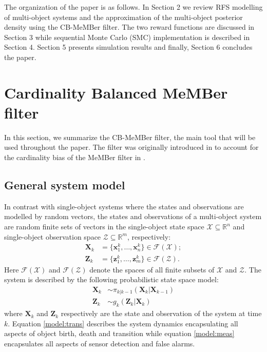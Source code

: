\documentclass[twocolumn]{autart}
\begin{document}
The organization of the paper is as follows. In Section 2 we review RFS
modelling of multi-object systems and the approximation of the multi-object
posterior density using the CB-MeMBer filter. The two reward functions are
discussed in Section 3 while sequential Monte Carlo (SMC) implementation is
described in Section 4. Section 5 presents simulation results and finally,
Section 6 concludes the paper.



\section{Cardinality Balanced MeMBer filter}

In this section, we summarize the CB-MeMBer filter, the main tool that will
be used throughout the paper. The filter was originally introduced in \cite {VVC09} to account for the cardinality bias of the MeMBer filter in \cite {Mah07}.

\subsection{General system model}

In contrast with single-object systems where the states and observations are
modelled by random vectors, the states and observations of a multi-object
system are random finite sets of vectors in the single-object state space $\mathcal{X}\subseteq \mathbb{R}^{n}$ and single-object observation space
$\mathcal{Z}\subseteq \mathbb{R}^{m}$, respectively:
\begin{align}
\mathbf{X}_{k}& =\{\mathbf{x}_{1}^{k},\ldots ,\mathbf{x}_{n}^{k}\}\in
\mathcal{F}(\mathcal{X}); \\
\mathbf{Z}_{k}& =\{\mathbf{z}_{1}^{k},\ldots ,\mathbf{z}_{m}^{k}\}\in
\mathcal{F}(\mathcal{Z}).
\end{align}Here $\mathcal{F}(\mathcal{X})$ and $\mathcal{F}(\mathcal{Z})$ denote the
spaces of all finite subsets of $\mathcal{X}$ and $\mathcal{Z}$. The system is described by the following
probabilistic state space model:
\begin{align}
\mathbf{X}_{k}& \sim \pi _{k|k-1}(\mathbf{X}_{k}|\mathbf{X}_{k-1})
\label{model:trans} \\
\mathbf{Z}_{k}& \sim g_{k}(\mathbf{Z}_{k}|\mathbf{X}_{k})  \label{model:meas}
\end{align}where $\mathbf{X}_{k}$ and $\mathbf{Z}_{k}$ respectively are the state and
observation of the system at time $k$. Equation \eqref{model:trans}
describes the system dynamics encapsulating all aspects of object birth,
death and transition while equation \eqref{model:meas} encapsulates all aspects of sensor
detection and false alarms.
\end{document}
